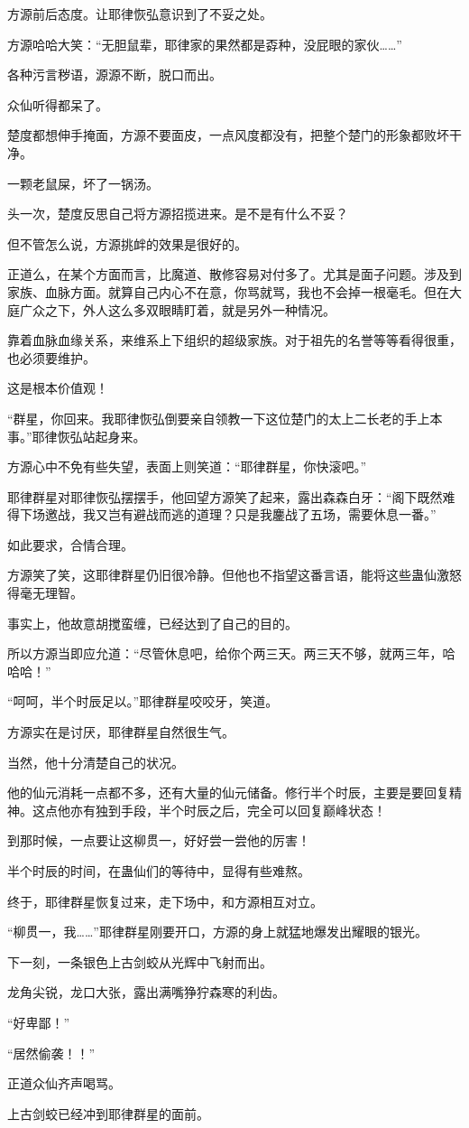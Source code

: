 \begin{this_body}
方源前后态度。让耶律恢弘意识到了不妥之处。

方源哈哈大笑：“无胆鼠辈，耶律家的果然都是孬种，没屁眼的家伙……”

各种污言秽语，源源不断，脱口而出。

众仙听得都呆了。

楚度都想伸手掩面，方源不要面皮，一点风度都没有，把整个楚门的形象都败坏干净。

一颗老鼠屎，坏了一锅汤。

头一次，楚度反思自己将方源招揽进来。是不是有什么不妥？

但不管怎么说，方源挑衅的效果是很好的。

正道么，在某个方面而言，比魔道、散修容易对付多了。尤其是面子问题。涉及到家族、血脉方面。就算自己内心不在意，你骂就骂，我也不会掉一根毫毛。但在大庭广众之下，外人这么多双眼睛盯着，就是另外一种情况。

靠着血脉血缘关系，来维系上下组织的超级家族。对于祖先的名誉等等看得很重，也必须要维护。

这是根本价值观！

“群星，你回来。我耶律恢弘倒要亲自领教一下这位楚门的太上二长老的手上本事。”耶律恢弘站起身来。

方源心中不免有些失望，表面上则笑道：“耶律群星，你快滚吧。”

耶律群星对耶律恢弘摆摆手，他回望方源笑了起来，露出森森白牙：“阁下既然难得下场邀战，我又岂有避战而逃的道理？只是我鏖战了五场，需要休息一番。”

如此要求，合情合理。

方源笑了笑，这耶律群星仍旧很冷静。但他也不指望这番言语，能将这些蛊仙激怒得毫无理智。

事实上，他故意胡搅蛮缠，已经达到了自己的目的。

所以方源当即应允道：“尽管休息吧，给你个两三天。两三天不够，就两三年，哈哈哈！”

“呵呵，半个时辰足以。”耶律群星咬咬牙，笑道。

方源实在是讨厌，耶律群星自然很生气。

当然，他十分清楚自己的状况。

他的仙元消耗一点都不多，还有大量的仙元储备。修行半个时辰，主要是要回复精神。这点他亦有独到手段，半个时辰之后，完全可以回复巅峰状态！

到那时候，一点要让这柳贯一，好好尝一尝他的厉害！

半个时辰的时间，在蛊仙们的等待中，显得有些难熬。

终于，耶律群星恢复过来，走下场中，和方源相互对立。

“柳贯一，我……”耶律群星刚要开口，方源的身上就猛地爆发出耀眼的银光。

下一刻，一条银色上古剑蛟从光辉中飞射而出。

龙角尖锐，龙口大张，露出满嘴狰狞森寒的利齿。

“好卑鄙！”

“居然偷袭！！”

正道众仙齐声喝骂。

上古剑蛟已经冲到耶律群星的面前。

\end{this_body}


